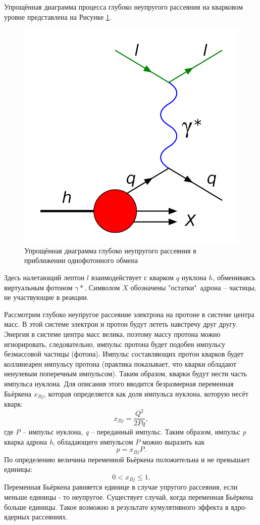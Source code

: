 \documentclass{extarticle}
\begin{document}
Упрощённая диаграмма процесса глубоко неупругого рассеяния на кварковом уровне представлена на Рисунке \ref{fig:DIS}.
\newpage

\begin{figure}[h!]
    \centering
    \includegraphics[width = 0.7\linewidth]{DIS.png}
    \caption{Упрощённая диаграмма глубоко неупругого рассеяния в приближении однофотонного обмена}
    \label{fig:DIS}
\end{figure}

Здесь налетающий лептон $l$ взаимодействует с кварком $q$ нуклона $h$, обмениваясь виртуальным фотоном $\gamma*$. Символом $X$ обозначены "остатки"\  адрона -- частицы, не участвующие в реакции.

Рассмотрим глубоко неупругое рассеяние электрона на протоне в системе центра масс. В этой системе электрон и протон будут лететь навстречу друг другу. Энергия в системе центра масс велика, поэтому массу протона можно игнорировать, следовательно, импульс протона будет подобен импульсу безмассовой частицы (фотона). Импульс составляющих протон кварков будет коллинеарен импульсу протона (практика показывает, что кварки обладают ненулевым поперечным импульсом). Таким образом, кварки будут нести часть импульса нуклона. Для описания этого вводится безразмерная переменная Бьёркена $x_{Bj}$, которая определяется как доля импульса нуклона, которую несёт кварк:
\begin{equation}
    x_{Bj}= \frac{Q^2}{2Pq},
\end{equation}
где \textit{P} -- импульс нуклона, \textit{q} -- переданный импульс. 
Таким образом, импульс \textit{p} кварка адрона \textit{h}, обладающего импульсом $P$ можно выразить как
\begin{equation}
    p=x_{Bj}P.
\end{equation}
По определению величина переменной Бьёркена положительна и не превышает единицы: 
\begin{equation}
    0 < x_{Bj} \leq 1.
\end{equation}
Переменная Бьёркена равняется единице в случае упругого рассеяния, если меньше единицы - то неупругое. Существует случай, когда переменная Бьёркена больше единицы. Такое возможно в результате кумулятивного эффекта в ядро-ядерных рассеяниях.
\end{document}
